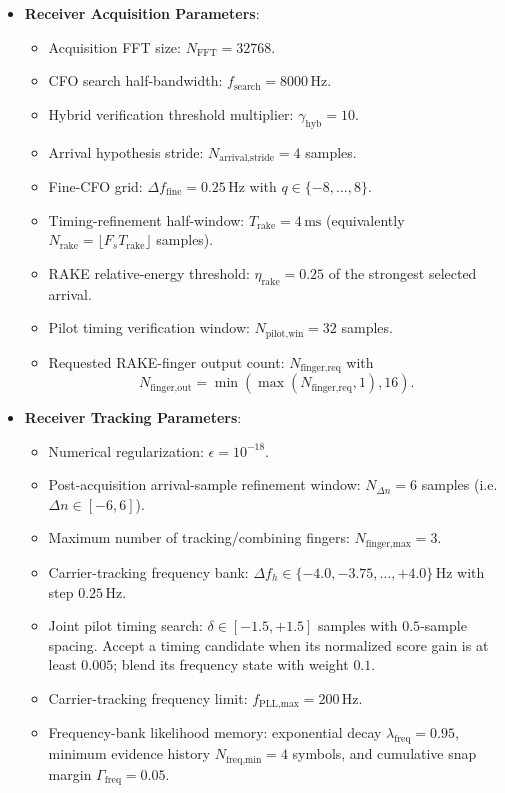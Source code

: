 \documentclass[11pt]{article}
\begin{document}
\begin{itemize}
\begin{itemize}
  \end{itemize}
\item \textbf{Receiver Acquisition Parameters}:
  \begin{itemize}
  \item Acquisition FFT size: $N_{\text{FFT}}=32768$.
  \item CFO search half-bandwidth: $f_{\text{search}}=8000\,\text{Hz}$.
  \item Hybrid verification threshold multiplier: $\gamma_{\text{hyb}}=10$.
  \item Arrival hypothesis stride: $N_{\text{arrival,stride}}=4$ samples.
  \item Fine-CFO grid: $\Delta f_{\text{fine}}=0.25\,\text{Hz}$ with $q\in\{-8,\dots,8\}$.
  \item Timing-refinement half-window: $T_{\text{rake}}=4\,\text{ms}$ (equivalently $N_{\text{rake}}=\lfloor F_s T_{\text{rake}}\rfloor$ samples).
  \item RAKE relative-energy threshold: $\eta_{\text{rake}}=0.25$ of the strongest selected arrival.
  \item Pilot timing verification window: $N_{\text{pilot,win}}=32$ samples.
  \item Requested RAKE-finger output count: $N_{\text{finger,req}}$ with
    \[
      N_{\text{finger,out}}=\min(\max(N_{\text{finger,req}},1),16).
    \]
  \end{itemize}
\item \textbf{Receiver Tracking Parameters}:
  \begin{itemize}
  \item Numerical regularization: $\epsilon=10^{-18}$.
  \item Post-acquisition arrival-sample refinement window: $N_{\Delta n}=6$ samples (i.e.\ $\Delta n\in[-6,6]$).
  \item Maximum number of tracking/combining fingers: $N_{\text{finger,max}}=3$.
  \item Carrier-tracking frequency bank: $\Delta f_h \in \{-4.0,-3.75,\dots,+4.0\}\,\text{Hz}$ with step $0.25\,\text{Hz}$.
  \item Joint pilot timing search: $\delta\in[-1.5,+1.5]$ samples with $0.5$-sample spacing. Accept a timing candidate when its normalized score gain is at least $0.005$; blend its frequency state with weight $0.1$.
  \item Carrier-tracking frequency limit: $f_{\text{PLL,max}}=200\,\text{Hz}$.
  \item Frequency-bank likelihood memory: exponential decay $\lambda_{\text{freq}}=0.95$, minimum evidence history $N_{\text{freq,min}}=4$ symbols, and cumulative snap margin $\Gamma_{\text{freq}}=0.05$.

\end{itemize}
\end{itemize}
\end{document}

